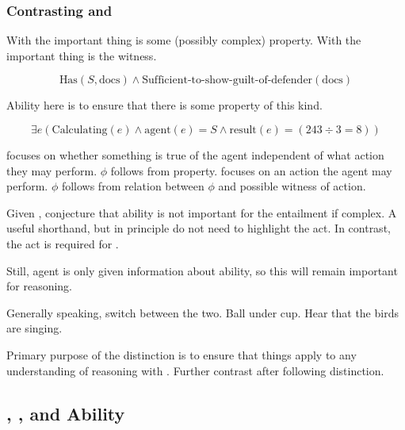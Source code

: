 \subsubsection{Contrasting \AR{} and \WR{}}
\label{sec:contrasting-ar-wr}

\begin{note}[Difference]
  With \AR{} the important thing is some (possibly complex) property.
  With \WR{} the important thing is the witness.

  \[\text{Has}(S,\text{docs}) \land \text{Sufficient-to-show-guilt-of-defender}(\text{docs})\]

  Ability here is to ensure that there is some property of this kind.

  \[\exists e(\text{Calculating}(e) \land \text{agent}(e) = S \land \text{result}(e) = (243 \div 3 = 8))\]


  \AR{} focuses on whether something is true of the agent independent of what action they may perform.
  \(\phi\) follows from property.
  \WR{} focuses on an action the agent may perform.
  \(\phi\) follows from relation between \(\phi\) and possible witness of action.
\end{note}

\begin{note}
  Given \AR{}, conjecture that ability is not important for the entailment if complex.
  A useful shorthand, but in principle do not need to highlight the act.
  In contrast, the act is required for \WR{}.

  Still, agent is only given information about ability, so this will remain important for reasoning.
\end{note}

\begin{note}
  Generally speaking, switch between the two.
  Ball under cup.
  Hear that the birds are singing.
\end{note}

\begin{note}
  Primary purpose of the distinction is to ensure that things apply to any understanding of reasoning with .
  Further contrast after following distinction.
\end{note}

\subsection{\adA{}, \adB{}, and Ability}
\label{sec:ability-ads-adc}

